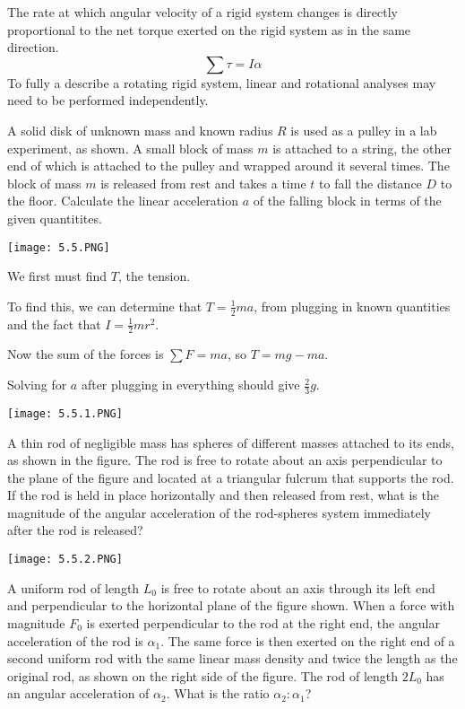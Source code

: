 \documentclass[../mech.tex]{subfiles}
\begin{document}
The rate at which angular velocity of a rigid system changes is directly proportional to the net torque exerted on the rigid system as in the same direction.
\[ \sum \tau = I\alpha \]
To fully a describe a rotating rigid system, linear and rotational analyses may need to be performed independently.
\pagebreak
\begin{example}
    A solid disk of unknown mass and known radius $R$ is used as a pulley in a lab experiment, as shown. A small block of mass $m$ is attached to a string, the other end of which is attached to the pulley and wrapped around it several times.
    The block of mass $m$ is released from rest and takes a time $t$ to fall the distance $D$ to the floor. Calculate the linear acceleration $a$ of the falling block in terms of the given quantitites.
    \begin{center}
        \texttt{[image: 5.5.PNG]}
    \end{center}

    We first must find $T$, the tension.

    To find this, we can determine that $T=\frac{1}{2}ma$, from plugging in known quantities and the fact that $I=\frac{1}{2}mr^2$.

    Now the sum of the forces is $\sum F = ma$, so $T=mg-ma$.

    Solving for $a$ after plugging in everything should give $\frac{2}{3}g$.
\end{example}

\ex \begin{center}
    \texttt{[image: 5.5.1.PNG]}
\end{center}
A thin rod of negligible mass has spheres of different masses attached to its ends, as shown in the figure. The rod is free to rotate about an axis perpendicular to the plane of the figure and located at a triangular fulcrum that supports the rod.
If the rod is held in place horizontally and then released from rest, what is the magnitude of the angular acceleration of the rod-spheres system immediately after the rod is released?

\pagebreak
\ex \begin{center}
    \texttt{[image: 5.5.2.PNG]}
\end{center}
A uniform rod of length $L_0$ is free to rotate about an axis through its left end and perpendicular to the horizontal plane of the figure shown. When a force with magnitude $F_0$ is exerted perpendicular to the rod at the right end, 
the angular acceleration of the rod is $\alpha_1$. The same force is then exerted on the right end of a second uniform rod with the same linear mass density and twice the length as the original rod, as shown on the right side of the figure.
The rod of length $2L_0$ has an angular acceleration of $\alpha_2$. What is the ratio $\alpha_2:\alpha_1$?
\end{document}
